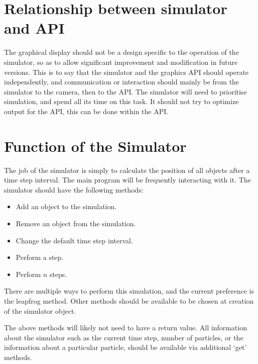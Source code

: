 \documentclass{report}
\begin{document}
    \section{Relationship between simulator and API}
      The graphical display should not be a design specific to the
      operation of the simulator, so as to allow significant improvement
      and modification in future versions. This is to say that the
      simulator and the graphics API should operate independently, and
      communication or interaction should mainly be from the simulator to the camera,
      then to the API. The simulator will need to prioritise simulation, and spend all
      its time on this task. It should not try to optimize output for the API,
      this can be done within the API.

    \section{Function of the Simulator}
      The job of the simulator is simply to calculate the position of all objects
      after a time step interval. The main program will be frequently interacting with it.
      The simulator should have the following methods:
      \begin{itemize}
        \item Add an object to the simulation.
        \item Remove an object from the simulation.
        \item Change the default time step interval.
        \item Perform a step.
        \item Perform $n$ steps.
      \end{itemize}
      There are multiple ways to perform this simulation, and the current preference
      is the leapfrog method. Other methods should be available to be chosen at creation of
      the simulator object.

      The above methods will likely not need to have a return value. All information about the
      simulator such as the current time step, number of particles, or the information about a
      particular particle, should be available via additional `get' methods.
\end{document}
